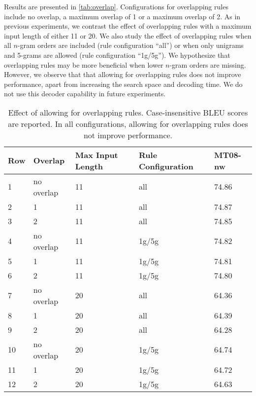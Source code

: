 Results are presented in
\autoref{tab:overlap}. Configurations for overlapping rules
include no overlap, a maximum overlap of 1 or a maximum overlap of 2.
As in previous experiments, we contrast the effect of overlapping
rules with a maximum input length of either 11 or 20.
We also study the effect of overlapping rules when
all $n$-gram orders are included (rule configuration ``all'') or
when only unigrams and 5-grams are allowed (rule configuration ``1g/5g'').
We hypothesize that overlapping rules may be more beneficial
when lower $n$-gram orders are missing.
However, we observe that
that allowing for overlapping rules does not improve performance, apart from 
increasing the search space and decoding time.
We do not use this decoder capability in future experiments.

\begin{table}
  \begin{center}
  \begin{tabular}{l|l|l|l|l}
    Row & Overlap & Max Input Length &  Rule Configuration & MT08-nw \\
    \hline
    1 & no overlap & 11 & all & 74.86 \\
    2 & 1          & 11 & all & 74.87 \\
    3 & 2          & 11 & all & 74.85 \\
    \hline
    4 & no overlap & 11 & 1g/5g & 74.82 \\
    5 & 1          & 11 & 1g/5g & 74.81 \\
    6 & 2          & 11 & 1g/5g & 74.80 \\
    \hline
    7 & no overlap & 20 & all & 64.36 \\
    8 & 1          & 20 & all & 64.39 \\
    9 & 2          & 20 & all & 64.28 \\
    \hline
    10 & no overlap & 20 & 1g/5g & 64.74 \\
    11 & 1          & 20 & 1g/5g & 64.72 \\
    12 & 2          & 20 & 1g/5g & 64.63 \\
  \end{tabular}
  \caption{Effect of allowing for overlapping rules. Case-insensitive BLEU
    scores are reported. In all configurations, allowing for overlapping
    rules does not improve performance.}
  \label{tab:overlap}
  \end{center}
\end{table}

